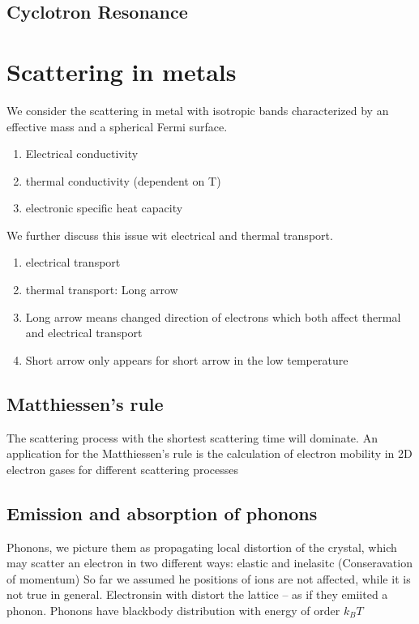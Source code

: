 \documentclass[12pt,a4paper]{article}
\begin{document}
\subsection{Cyclotron Resonance}
\section{Scattering in metals}
We consider the scattering in metal with isotropic bands characterized by an effective mass and a spherical Fermi surface.
\begin{enumerate}
    \item Electrical conductivity
    \item thermal conductivity (dependent on T)
    \item electronic specific heat capacity
\end{enumerate}
We further discuss this issue wit electrical and thermal transport.
\begin{enumerate}
    \item electrical transport
    \item thermal transport: Long arrow
    \item Long arrow means changed direction of electrons which both affect thermal and electrical transport
    \item Short arrow only appears for short arrow in the low temperature
\end{enumerate}
\subsection{Matthiessen's rule}
The scattering process with the shortest scattering time will dominate.
An application for the Matthiessen's rule is the calculation of electron mobility in 2D electron gases for different scattering processes
\subsection{Emission and absorption of phonons}
Phonons, we picture them as propagating local distortion of the crystal, which may scatter an electron in two different ways: elastic and inelasitc (Conseravation of momentum)
So far we assumed he positions of ions are not affected, while it is not true in general. Electronsin with distort the lattice -- as if they emiited a phonon.
Phonons have blackbody distribution with energy of order $k_B T$
\end{document}
